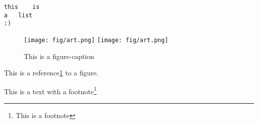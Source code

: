 \documentclass[10pt,a4paper]{article}
\begin{document}
\begin{lstlisting}[basicstyle=\footnotesize, frame=single, caption = This is a list caption, label = lst:list1]
this	is
a	list
:)
\end{lstlisting}
\pagebreak



\begin{figure}[H]
\centering	%
\texttt{[image: fig/art.png]}
\texttt{[image: fig/art.png]}
\caption{This is a figure-caption}
\label{fig:figure1}
\end{figure}
This is a reference\ref{fig:figure1} to a figure.
\pagebreak



This is a text with a footnote\footnote{This is a footnote}



\newpage	%
\pagebreak	%
\vfill		%
\newcommand{\dt}{\Delta t}	%
\end{document}
